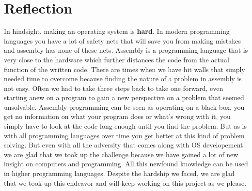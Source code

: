 \section{Reflection}

In hindsight, making an operating system is \textbf{hard}. In modern programming languages you have a
lot of safety nets that will save you from making mistakes and assembly has none of these nets.
Assembly is a programming language that is very close to the hardware which further distances 
the code from the actual function of the written code. There are times when we have hit
walls that simply needed time to overcome because finding the nature of a problem in assembly
is not easy. Often we had to take three steps back to take one forward, even starting anew on
a program to gain a new perspective on a problem that seemed unsolvable. Assembly programming 
can be seen as operating on a black box, you get no information on what your program does or
what's wrong with it, you simply have to look at the code long enough until you find the problem.
But as is with all programming languages over time you get better at this kind of problem solving.
But even with all the adversity that comes along with OS developement we are glad that we took up
the challenge because we have gained a lot of new insight on computers and programming. All this
newfound knowledge can be used in higher programming languages. Despite the hardship we faced, we
are glad that we took up this endeavor and will keep working on this project as we please.
